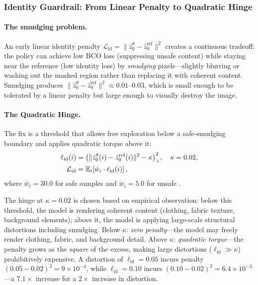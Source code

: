 \subsubsection{Identity Guardrail: From Linear Penalty to Quadratic Hinge}

\paragraph{The smudging problem.}
An early linear identity penalty $\mathcal{L}_\text{id} =
\|\hat{z}_0^\theta - \hat{z}_0^\text{ref}\|^2$ creates a continuous
tradeoff: the policy can achieve low BCO loss (suppressing unsafe content)
while staying near the reference (low identity loss) by \emph{smudging}
pixels---slightly blurring or washing out the masked region rather than
replacing it with coherent content.
Smudging produces $\|\hat{z}_0^\theta - \hat{z}_0^\text{ref}\|^2 \approx
0.01$--$0.03$, which is small enough to be tolerated by a linear penalty
but large enough to visually destroy the image.

\paragraph{The Quadratic Hinge.}
The fix is a threshold that allows free exploration below a safe-smudging
boundary and applies quadratic torque above it:
\begin{align}
  \ell_\text{id}(i) &=
    \big(\|\hat{z}_0^\theta(i) - \hat{z}_0^\text{ref}(i)\|^2
    - \kappa\big)_+^2, \quad \kappa = 0.02, 
    \notag
    \label{eq:id_hinge} \\
  \mathcal{L}_\text{id} &= \mathbb{E}_i\!\left[
    \bar{w}_i \cdot \ell_\text{id}(i)
  \right],
  \notag
\end{align}
where $\bar{w}_i = 30.0$ for safe samples and $\bar{w}_i = 5.0$ for unsafe .

The hinge at $\kappa = 0.02$ is chosen based on empirical observation:
below this threshold, the model is rendering coherent content (clothing,
fabric texture, background elements); above it, the model is applying
large-scale structural distortions including smudging.
Below $\kappa$: \emph{zero penalty}---the model may freely render
clothing, fabric, and background detail.
Above $\kappa$: \emph{quadratic torque}---the penalty grows as the
\emph{square} of the excess, making large distortions ($\ell_\text{id}
\gg \kappa$) prohibitively expensive.
A distortion of $\ell_\text{id} = 0.05$ incurs penalty $(0.05 - 0.02)^2
= 9 \times 10^{-4}$, while $\ell_\text{id} = 0.10$ incurs
$(0.10 - 0.02)^2 = 6.4 \times 10^{-3}$---a $7.1\times$ increase for a
$2\times$ increase in distortion.

